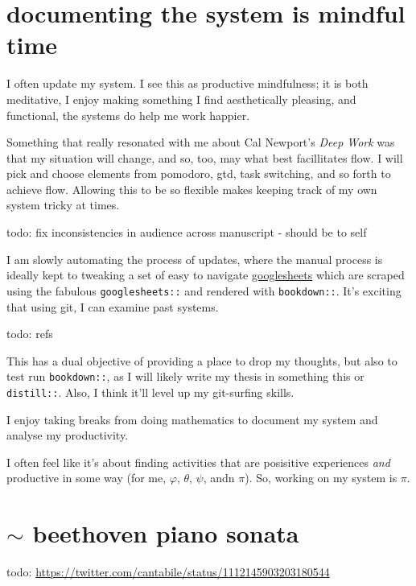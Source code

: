 \documentclass[]{book}
\begin{document}
\hypertarget{documenting-the-system-is-mindful-time}{%
\section{documenting the system is mindful time}\label{documenting-the-system-is-mindful-time}}

I often update my system. I see this as productive mindfulness; it is both meditative, I enjoy making something I find aesthetically pleasing, and functional, the systems do help me work happier.

Something that really resonated with me about Cal Newport's \emph{Deep Work} was that my situation will change, and so, too, may what best facillitates flow. I will pick and choose elements from pomodoro, gtd, task switching, and so forth to achieve flow. Allowing this to be so flexible makes keeping track of my own system tricky at times.

todo: fix inconsistencies in audience across manuscript - should be to self

I am slowly automating the process of updates, where the manual process is ideally kept to tweaking a set of easy to navigate \href{https://docs.google.com/spreadsheets/d/1hv7pkBGu8XQQOIBbBt1_1LvKGBR7zTdQYCzogrv3hz0/edit?usp=sharing}{googlesheets} which are scraped using the fabulous \texttt{googlesheets::} and rendered with \texttt{bookdown::}. It's exciting that using git, I can examine past systems.

todo: refs

This has a dual objective of providing a place to drop my thoughts, but also to test run \texttt{bookdown::}, as I will likely write my thesis in something this or \texttt{distill::}. Also, I think it'll level up my git-surfing skills.

I enjoy taking breaks from doing mathematics to document my system and analyse my productivity.

I often feel like it's about finding activities that are posisitive experiences \emph{and} productive in some way (for me, \(\varphi\), \(\theta\), \(\psi\), andn \(\pi\)). So, working on my system is \(\pi\).

\hypertarget{sim-beethoven-piano-sonata}{%
\section{\texorpdfstring{\(\sim\) beethoven piano sonata}{\textbackslash{}sim beethoven piano sonata}}\label{sim-beethoven-piano-sonata}}

todo:
\url{https://twitter.com/cantabile/status/1112145903203180544}


\end{document}
